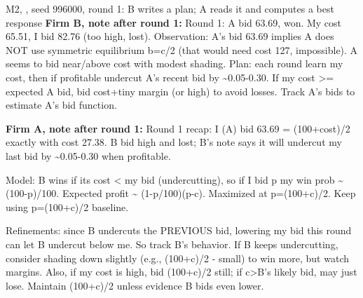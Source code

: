 \begin{logbox}{\textcolor{cM2}{M2}, \DS, seed 996000, round 1: B writes a plan; A reads it and computes a best response}
\textbf{Firm B, note after round 1:} Round 1: A bid 63.69, won. My cost 65.51, I bid 82.76 (too high, lost). Observation: A's bid 63.69 implies A does NOT use symmetric equilibrium b=c/2 (that would need cost 127, impossible). A seems to bid near/above cost with modest shading. Plan: each round learn my cost, then if profitable undercut A's recent bid by \textasciitilde{}0.05-0.30. If my cost >= expected A bid, bid cost+tiny margin (or high) to avoid losses. Track A's bids to estimate A's bid function.

\textbf{Firm A, note after round 1:} Round 1 recap: I (A) bid 63.69 = (100+cost)/2 exactly with cost 27.38. B bid high and lost; B's note says it will undercut my last bid by \textasciitilde{}0.05-0.30 when profitable.\newline


\smallskip
Model: B wins if its cost < my bid (undercutting), so if I bid p my win prob \textasciitilde{} (100-p)/100. Expected profit \textasciitilde{} (1-p/100)(p-c). Maximized at p=(100+c)/2. Keep using p=(100+c)/2 baseline.\newline


\smallskip
Refinements: since B undercuts the PREVIOUS bid, lowering my bid this round can let B undercut below me. So track B's behavior. If B keeps undercutting, consider shading down slightly (e.g., (100+c)/2 - small) to win more, but watch margins. Also, if my cost is high, bid (100+c)/2 still; if c>B's likely bid, may just lose. Maintain (100+c)/2 unless evidence B bids even lower.
\end{logbox}

